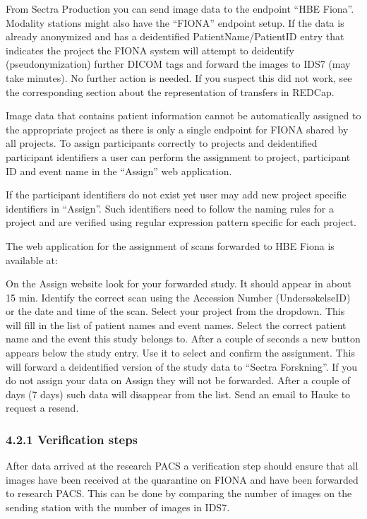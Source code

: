 \documentclass[letterpaper,10pt,english]{sphinxmanual}
\begin{document}
\sphinxAtStartPar
From Sectra Production you can send image data to the endpoint “HBE Fiona”. Modality stations might also have the “FIONA” endpoint setup. If the data is already anonymized and has a de\sphinxhyphen{}identified PatientName/PatientID entry that indicates the project the FIONA system will attempt to de\sphinxhyphen{}identify (pseudonymization) further DICOM tags and forward the images to IDS7 (may take minutes). No further action is needed. If you suspect this did not work, see the corresponding section about the representation of transfers in REDCap.

\sphinxAtStartPar
Image data that contains patient information cannot be automatically assigned to the appropriate project as there is only a single endpoint for FIONA shared by all projects. To assign participants correctly to projects and de\sphinxhyphen{}identified participant identifiers a user can perform the assignment to project, participant ID and event name in the “Assign” web application.

\sphinxAtStartPar
If the participant identifiers do not exist yet user may add new project specific identifiers in “Assign”. Such identifiers need to follow the naming rules for a project and are verified using regular expression pattern specific for each project.

\sphinxAtStartPar
The web application for the assignment of scans forwarded to HBE Fiona is available at:

\sphinxAtStartPar
On the Assign website look for your forwarded study. It should appear in about 15 min.
Identify the correct scan using the Accession Number (Undersøkelse\sphinxhyphen{}ID) or the date and time
of the scan. Select your project from the drop\sphinxhyphen{}down. This will fill in the list of patient names
and event names. Select the correct patient name and the event this study belongs to. After
a couple of seconds a new button appears below the study entry. Use it to select and
confirm the assignment. This will forward a de\sphinxhyphen{}identified version of the study data to “Sectra
Forskning”. If you do not assign your data on Assign they will not be forwarded. After a
couple of days (7 days) such data will disappear from the list. Send an email to Hauke to request
a resend.


\subsubsection{4.2.1 Verification steps}
\label{\detokenize{EndUser/index:verification-steps}}
\sphinxAtStartPar
After data arrived at the research PACS a verification step should ensure that all images have been received at the quarantine on FIONA and have been forwarded to research PACS. This can be done by comparing the number of images on the sending station with the number of images in IDS7.
\end{document}
